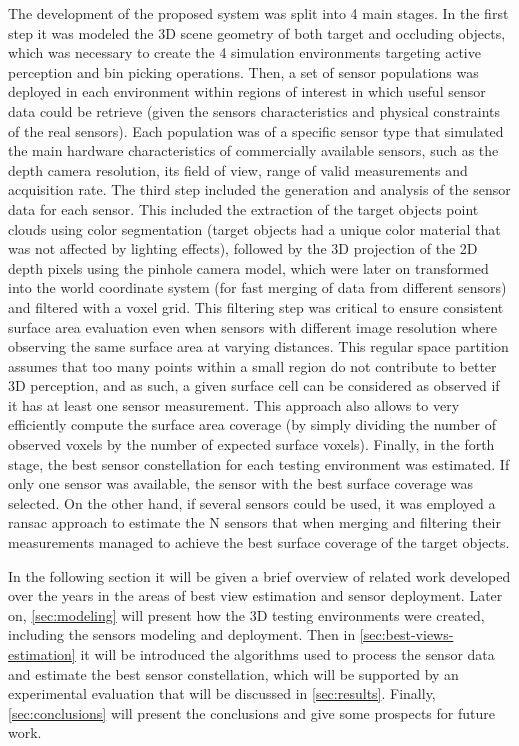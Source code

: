 The development of the proposed system was split into 4 main stages. In the first step it was modeled the 3D scene geometry of both target and occluding objects, which was necessary to create the 4 simulation environments targeting active perception and bin picking operations. Then, a set of sensor populations was deployed in each environment within regions of interest in which useful sensor data could be retrieve (given the sensors characteristics and physical constraints of the real sensors). Each population was of a specific sensor type that simulated the main hardware characteristics of commercially available sensors, such as the depth camera resolution, its field of view, range of valid measurements and acquisition rate. The third step included the generation and analysis of the sensor data for each sensor. This included the extraction of the target objects point clouds using color segmentation (target objects had a unique color material that was not affected by lighting effects), followed by the 3D projection of the 2D depth pixels using the pinhole camera model, which were later on transformed into the world coordinate system (for fast merging of data from different sensors) and filtered with a voxel grid. This filtering step was critical to ensure consistent surface area evaluation even when sensors with different image resolution where observing the same surface area at varying distances. This regular space partition assumes that too many points within a small region do not contribute to better 3D perception, and as such, a given surface cell can be considered as observed if it has at least one sensor measurement. This approach also allows to very efficiently compute the surface area coverage (by simply dividing the number of observed voxels by the number of expected surface voxels). Finally, in the forth stage, the best sensor constellation for each testing environment was estimated. If only one sensor was available, the sensor with the best surface coverage was selected. On the other hand, if several sensors could be used, it was employed a \gls{ransac} approach to estimate the N sensors that when merging and filtering their measurements managed to achieve the best surface coverage of the target objects.

In the following section it will be given a brief overview of related work developed over the years in the areas of best view estimation and sensor deployment. Later on, \cref{sec:modeling} will present how the 3D testing environments were created, including the sensors modeling and deployment. Then in \cref{sec:best-views-estimation} it will be introduced the algorithms used to process the sensor data and estimate the best sensor constellation, which will be supported by an experimental evaluation that will be discussed in \cref{sec:results}. Finally, \cref{sec:conclusions} will present the conclusions and give some prospects for future work.
